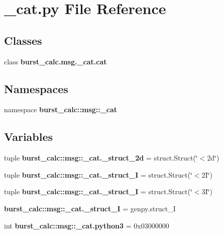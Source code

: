 \section{\-\_\-cat.\-py \-File \-Reference}
\label{__cat_8py}
\subsection*{\-Classes}
\begin{DoxyCompactItemize}
\item 
class {\bf burst\-\_\-calc.\-msg.\-\_\-cat.\-cat}
\end{DoxyCompactItemize}
\subsection*{\-Namespaces}
\begin{DoxyCompactItemize}
\item 
namespace {\bf burst\-\_\-calc\-::msg\-::\-\_\-cat}
\end{DoxyCompactItemize}
\subsection*{\-Variables}
\begin{DoxyCompactItemize}
\item 
tuple {\bf burst\-\_\-calc\-::msg\-::\-\_\-cat.\-\_\-struct\-\_\-2d} = struct.\-Struct(\char`\"{}$<$2d\char`\"{})
\item 
tuple {\bf burst\-\_\-calc\-::msg\-::\-\_\-cat.\-\_\-struct\-\_\-I} = struct.\-Struct(\char`\"{}$<$2\-I\char`\"{})
\item 
tuple {\bf burst\-\_\-calc\-::msg\-::\-\_\-cat.\-\_\-struct\-\_\-I} = struct.\-Struct(\char`\"{}$<$3\-I\char`\"{})
\item 
{\bf burst\-\_\-calc\-::msg\-::\-\_\-cat.\-\_\-struct\-\_\-\-I} = genpy.\-struct\-\_\-\-I
\item 
int {\bf burst\-\_\-calc\-::msg\-::\-\_\-cat.\-python3} = 0x03000000
\end{DoxyCompactItemize}
